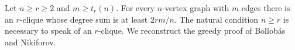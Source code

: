 Let \(n\geq r\geq2\) and \(m\geq t_r(n)\).
For every \(n\)-vertex graph with \(m\) edges there is an
\(r\)-clique whose degree sum is at least \(2rm/n\).
The natural condition \(n\geq r\) is necessary to speak
of an \(r\)-clique. We reconstruct the greedy proof of
Bollob\'as and Nikiforov.
